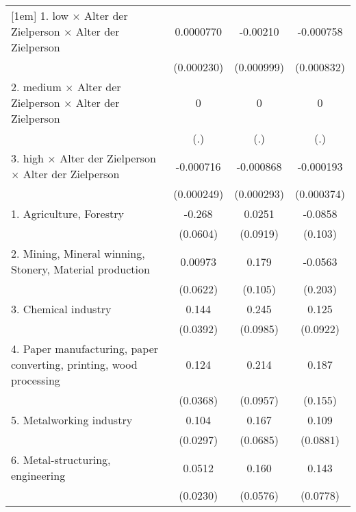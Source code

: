 {\begin{tabular}{l*{3}{c}}
[1em]
1. low $\times$ Alter der Zielperson $\times$ Alter der Zielperson&   0.0000770         &    -0.00210\sym{*}  &   -0.000758         \\
                    &  (0.000230)         &  (0.000999)         &  (0.000832)         \\
[1em]
2. medium $\times$ Alter der Zielperson $\times$ Alter der Zielperson&           0         &           0         &           0         \\
                    &         (.)         &         (.)         &         (.)         \\
[1em]
3. high $\times$ Alter der Zielperson $\times$ Alter der Zielperson&   -0.000716\sym{**} &   -0.000868\sym{**} &   -0.000193         \\
                    &  (0.000249)         &  (0.000293)         &  (0.000374)         \\
[1em]
1. Agriculture, Forestry&      -0.268\sym{***}&      0.0251         &     -0.0858         \\
                    &    (0.0604)         &    (0.0919)         &     (0.103)         \\
[1em]
2. Mining, Mineral winning, Stonery, Material production&     0.00973         &       0.179         &     -0.0563         \\
                    &    (0.0622)         &     (0.105)         &     (0.203)         \\
[1em]
3. Chemical industry&       0.144\sym{***}&       0.245\sym{*}  &       0.125         \\
                    &    (0.0392)         &    (0.0985)         &    (0.0922)         \\
[1em]
4. Paper manufacturing, paper converting, printing, wood processing&       0.124\sym{***}&       0.214\sym{*}  &       0.187         \\
                    &    (0.0368)         &    (0.0957)         &     (0.155)         \\
[1em]
5. Metalworking industry&       0.104\sym{***}&       0.167\sym{*}  &       0.109         \\
                    &    (0.0297)         &    (0.0685)         &    (0.0881)         \\
[1em]
6. Metal-structuring, engineering&      0.0512\sym{*}  &       0.160\sym{**} &       0.143         \\
                    &    (0.0230)         &    (0.0576)         &    (0.0778)         \\

\end{tabular}}
